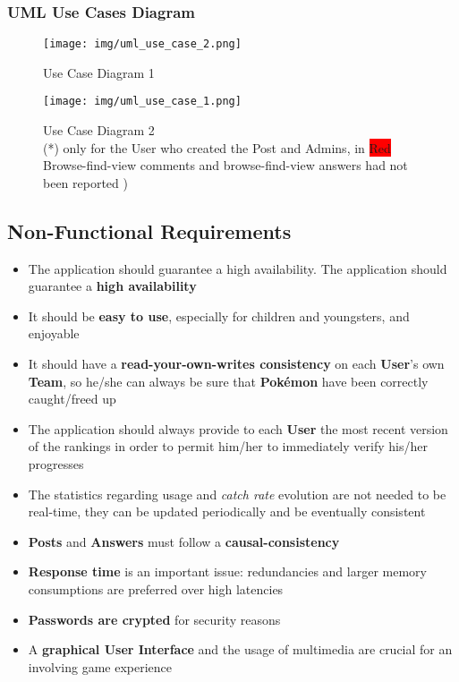\subsubsection{UML Use Cases Diagram}
\begin{figure}[H]
	\centering
	\texttt{[image: img/uml\_use\_case\_2.png]}
	\caption{Use Case Diagram 1}
\end{figure}
\begin{figure}[H]
	\centering
	\texttt{[image: img/uml\_use\_case\_1.png]}
	\caption{Use Case Diagram 2\\ (*) only for the User who created the Post and Admins, in  \colorbox{Red}{Red} Browse-find-view comments and browse-find-view answers had not been reported )}
	
\end{figure}


\subsection{Non-Functional Requirements}
\begin{itemize}
	\item The application should guarantee a high availability. The application should guarantee a \textbf{high availability}
	\item It should be \textbf{easy to use}, especially for children and youngsters, and enjoyable
	\item It should have a \textbf{read-your-own-writes consistency} on each \textbf{User}’s own \textbf{Team}, so he/she can always be sure that \textbf{Pokémon} have been correctly caught/freed up
	\item The application should always provide to each \textbf{User} the most recent version of the rankings in order to permit him/her to immediately verify his/her progresses
	\item The statistics regarding usage and \textit{catch rate} evolution are not needed to be real-time, they can be updated periodically and be eventually consistent
	\item \textbf{Posts} and \textbf{Answers} must follow a \textbf{causal-consistency}
	\item \textbf{Response time} is an important issue: redundancies and larger memory consumptions are preferred over high latencies
	\item \textbf{Passwords are crypted} for security reasons
	\item A \textbf{graphical User Interface} and the usage of multimedia are crucial for an involving game experience 
\end{itemize}
